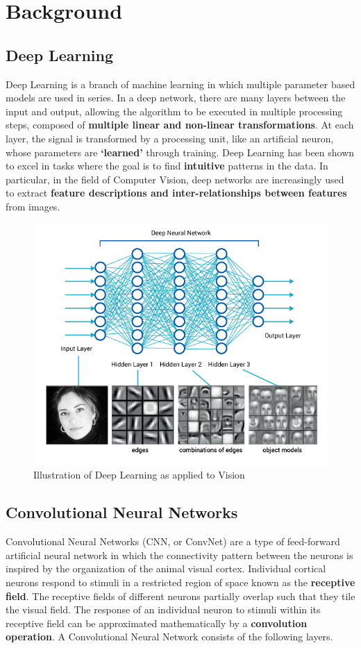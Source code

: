 \documentclass[11pt]{article}
\begin{document}
	\section{Background} 
			\subsection{Deep Learning}
				Deep Learning is a branch of machine learning in which multiple parameter based models are used in series. In a deep network, there are many layers between the input and output, allowing the algorithm to be executed in multiple processing steps, composed of \textbf{multiple linear and non-linear transformations}. At each layer, the signal is transformed by a processing unit, like an artificial neuron, whose parameters are \textbf{`learned'} through training. Deep Learning has been shown to excel in tasks where the goal is to find \textbf{intuitive} patterns in the data.\cite{deep} In particular, in the field of Computer Vision, deep networks are increasingly used to extract \textbf{feature descriptions and inter-relationships between features} from images.\cite{cs231n}
				\begin{figure}[ht!]
					\includegraphics[width=14cm]{blog_deeplearning3.jpg}
					\caption{Illustration of Deep Learning as applied to Vision\label{fig2}}
				\end{figure}	

			\subsection{Convolutional Neural Networks}
			Convolutional Neural Networks (CNN, or ConvNet) are a type of feed-forward artificial neural network in which the connectivity pattern between the neurons is inspired by the organization of the animal visual cortex. Individual cortical neurons respond to stimuli in a restricted region of space known as the \textbf{receptive field}. The receptive fields of different neurons partially overlap such that they tile the visual field. The response of an individual neuron to stimuli within its receptive field can be approximated mathematically by a \textbf{convolution operation}. A Convolutional Neural Network consists of the following layers.\cite{showandtell}
								
\end{document}
